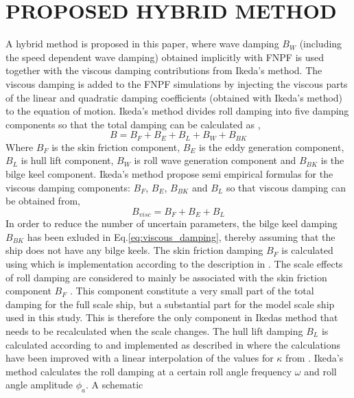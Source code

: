 \section*{PROPOSED HYBRID METHOD}\label{proposed-hybrid-method}
A hybrid method is proposed in this paper, where wave damping $B_W$
(including the speed dependent wave damping) obtained implicitly with
FNPF is used together with the viscous damping contributions from
Ikeda's method. The viscous damping is added to the FNPF simulations by
injecting the viscous parts of the linear and quadratic damping
coefficients (obtained with Ikeda's method) to the equation of motion.
Ikeda's method divides roll damping into five damping components so that
the total damping can be calculated as \citep{7505983/937PN5DT},
\begin{equation}
B = B_F + B_E + B_L + B_W + B_{BK}
\end{equation}
Where $B_F$ is the skin friction component, $B_E$ is the eddy
generation component, $B_L$ is hull lift component, $B_W$ is roll
wave generation component and $B_{BK}$ is the bilge keel component.
Ikeda's method propose semi empirical formulas for the viscous damping
components: $B_F$, $B_E$, $B_{BK}$ and $B_L$ so that viscous
damping can be obtained from,
\begin{equation}
\label{eq:viscous_damping}
B_{visc} = B_F + B_E + B_L
\end{equation}
\quad In order to reduce the number of uncertain parameters, the bilge
keel damping $B_{BK}$ has been exluded in
Eq.\ref{eq:viscous_damping}, thereby assuming that the ship does
not have any bilge keels.
\quad The skin friction damping $B_F$ is calculated using
\citep{7505983/CKCMI3N9} which is implementation according to the
description in \citep{7505983/UGK6YEVD}. The scale effects of roll
damping are considered to mainly be associated with the skin friction
component $B_F$ \citep{7505983/FB64RGPF}. This component constitute a
very small part of the total damping for the full scale ship, but a
substantial part for the model scale ship used in this study. This is
therefore the only component in Ikedas method that needs to be
recalculated when the scale changes.
\quad The hull lift damping $B_L$ is calculated according to
\citep{7505983/937PN5DT} and implemented as described in
\citep{7505983/UYUAYY7E} where the calculations have been improved with a
linear interpolation of the values for $\kappa$ from
\citep{7505983/937PN5DT}.
\quad Ikeda's method calculates the roll damping at a certain roll angle
frequency $\omega$ and roll angle amplitude $\phi_a$. A schematic
